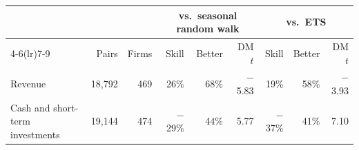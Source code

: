 \begin{tabular}{lrrrrrrrr}
\toprule
 & & & \multicolumn{3}{c}{vs.\ seasonal random walk} & \multicolumn{3}{c}{vs.\ ETS} \\
\cmidrule(lr){4-6}\cmidrule(lr){7-9}
 & Pairs & Firms & Skill & Better & DM $t$ & Skill & Better & DM $t$ \\
\midrule
Revenue & 18{,}792 & 469 & 26\% & 68\% & $-$5.83 & 19\% & 58\% & $-$3.93 \\
Cash and short-term investments & 19{,}144 & 474 & $-$29\% & 44\% & 5.77 & $-$37\% & 41\% & 7.10 \\
\bottomrule
\end{tabular}
